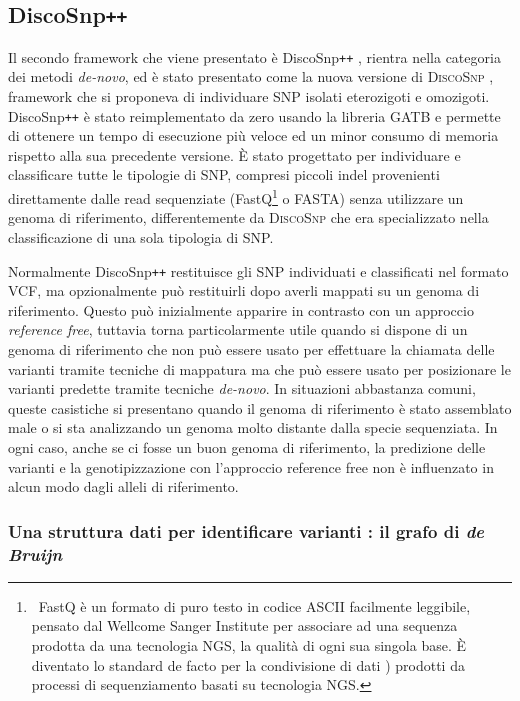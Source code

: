 \documentclass[../main.tex]{subfiles}
\begin{document}
\subsection{DiscoSnp\texttt{++}}
\label{discosnp++}

Il secondo framework che viene presentato è DiscoSnp\texttt{++} \cite{peterlongo2017discosnp++}, rientra nella categoria dei metodi \textit{de-novo}, ed è stato presentato come la nuova versione di \textsc{DiscoSnp} \cite{uricaru2015reference}, framework che si proponeva di individuare SNP isolati eterozigoti e omozigoti. DiscoSnp\texttt{++} è stato reimplementato da zero usando la libreria GATB \cite{drezen2014gatb} e permette di ottenere un tempo di esecuzione più veloce ed un minor consumo di memoria rispetto alla sua precedente versione. È stato progettato per individuare e classificare tutte le tipologie di SNP, compresi piccoli indel provenienti direttamente dalle read sequenziate (FastQ\footnote{\ FastQ è un formato di puro testo in codice ASCII facilmente leggibile, pensato dal Wellcome Sanger Institute per associare ad una sequenza prodotta da una tecnologia NGS, la qualità di ogni sua singola base. È diventato lo standard de facto per la condivisione di dati \cite{cock2010sanger}) prodotti da processi di sequenziamento basati su tecnologia NGS.} o FASTA) senza utilizzare un genoma di riferimento, differentemente da \textsc{DiscoSnp} che era specializzato nella classificazione di una sola tipologia di SNP.

Normalmente DiscoSnp\texttt{++} restituisce gli SNP individuati e classificati nel formato VCF, ma opzionalmente può restituirli dopo averli mappati su un genoma di riferimento. Questo può inizialmente apparire in contrasto con un approccio \textit{reference free}, tuttavia torna particolarmente utile quando si dispone di un genoma di riferimento che non può essere usato per effettuare la chiamata delle varianti tramite tecniche di mappatura ma che può essere usato per posizionare le varianti predette tramite tecniche \textit{de-novo}. In situazioni abbastanza comuni, queste casistiche si presentano quando il genoma di riferimento è stato assemblato male o si sta analizzando un genoma molto distante dalla specie sequenziata. In ogni caso, anche se ci fosse un buon genoma di riferimento, la predizione delle varianti e la genotipizzazione con l'approccio reference free non è influenzato in alcun modo dagli alleli di riferimento.

\subsubsection{Una struttura dati per identificare varianti : il grafo di \textit{de Bruijn}}
\label{dBG}
\end{document}
